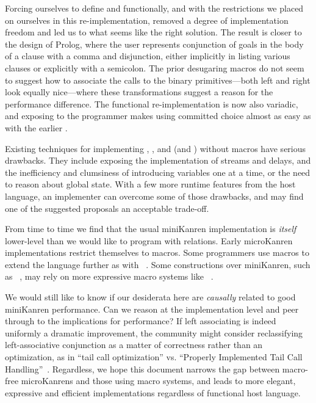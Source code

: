 \documentclass[runningheads,natbib=false]{llncs}
\begin{document}
Forcing ourselves to define  and 
functionally, and with the restrictions we placed on ourselves in this
re-implementation, removed a degree of implementation freedom and led
us to what seems like the right solution. The result is closer to the
design of Prolog, where the user represents conjunction of goals in
the body of a clause with a comma and disjunction, either implicitly
in listing various clauses or explicitly with a semicolon. The prior
desugaring macros do not seem to suggest how to associate the calls to
the binary primitives---both left and right look equally nice---where
these transformations suggest a reason for the performance difference.
The functional  re-implementation is now also
variadic, and exposing  to the programmer makes using
committed choice almost as easy as with the
earlier .

Existing techniques for
implementing , ,
and  (and ) without macros have
serious drawbacks. They include exposing the implementation of
streams and delays, and the inefficiency and clumsiness of introducing
variables one at a time, or the need to reason about global state. With
a few more runtime features from the host language, an implementer can
overcome some of those drawbacks, and may find one of the suggested
proposals an acceptable trade-off.

From time to time we find that the usual miniKanren implementation is
\emph{itself} lower-level than we would like to program with
relations. Early microKanren implementations restrict themselves
to  macros. Some programmers use macros to
extend the language further as
with ~\cite{keep2009pattern}. Some constructions
over miniKanren, such
as ~\cite{ballantyne2020macros}, may rely on
more expressive macro systems
like ~\cite{culpepper2012fortifying}.

We would still like to know if our desiderata here are \emph{causally}
related to good miniKanren performance. Can we reason at the
implementation level and peer through to the implications for
performance? If left associating  is indeed uniformly
a dramatic improvement, the community might consider reclassifying
left-associative conjunction as a matter of correctness rather than an
optimization, as in \enquote{tail call optimization} vs.
\enquote{Properly Implemented Tail Call
  Handling}~\cite{felleisen2014requestions}. Regardless, we hope this
document narrows the gap between macro-free microKanrens and those
using macro systems, and leads to more elegant, expressive and
efficient implementations regardless of functional host language.
\end{document}
